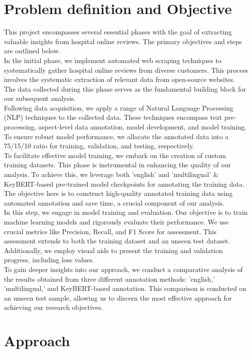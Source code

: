 \section{Problem definition and Objective}
This project encompasses several essential phases with the goal of extracting valuable insights from hospital online reviews. The primary objectives and steps are outlined below.
\\
In the initial phase, we implement automated web scraping techniques to systematically gather hospital online reviews from diverse customers. This process involves the systematic extraction of relevant data from open-source websites. The data collected during this phase serves as the fundamental building block for our subsequent analysis.
\\
Following data acquisition, we apply a range of Natural Language Processing (NLP) techniques to the collected data. These techniques encompass text pre-processing, aspect-level data annotation, model development, and model training. To ensure robust model performance, we allocate the annotated data into a 75/15/10 ratio for training, validation, and testing, respectively.
\\
To facilitate effective model training, we embark on the creation of custom training datasets. This phase is instrumental in enhancing the quality of our analysis. To achieve this, we leverage both 'english' and 'multilingual' & KeyBERT-based pre-trained model checkpoints for annotating the training data. The objective here is to construct high-quality annotated training data using automated annotation and save time, a crucial component of our analysis.
\\
In this step, we engage in model training and evaluation. Our objective is to train machine learning models and rigorously evaluate their performance. We use crucial metrics like Precision, Recall, and F1 Score for assessment. This assessment extends to both the training dataset and an unseen test dataset. Additionally, we employ visual aids to present the training and validation progress, including loss values.
\\
To gain deeper insights into our approach, we conduct a comparative analysis of the results obtained from three different annotation methods: 'english,' 'multilingual,' and KeyBERT-based annotation. This comparison is conducted on an unseen test sample, allowing us to discern the most effective approach for achieving our research objectives.
\clearpage
\section{Approach}
